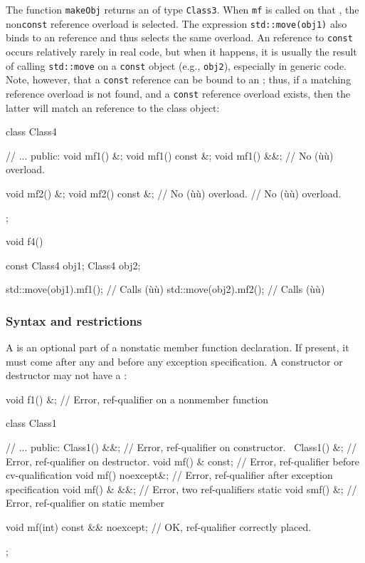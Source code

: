 The function \lstinline!makeObj! returns an  of type
\lstinline!Class3!. When \lstinline!mf! is called on that , the
non\lstinline!const!  reference overload is selected. The
expression \lstinline!std::move(obj1)! also binds to an 
reference and thus selects the same overload. An  reference
to \lstinline!const! occurs relatively rarely in real code, but when it
happens, it is usually the result of calling \lstinline!std::move! on a
\lstinline!const! object (e.g., \lstinline!obj2!), especially in generic code.
Note, however, that a \lstinline!const!  reference can be
bound to an ; thus, if a matching  reference
overload is not found, and a \lstinline!const!  reference
overload exists, then the latter will match an  reference
to the class object:

\begin{emcppslisting}[emcppsbatch=e1]
class Class4
{
    // ...
public:
    void mf1() &;
    void mf1() const &;
    void mf1() &&;
    // No (ù{}ù) overload.

    void mf2() &;
    void mf2() const &;
    // No (ù{}ù) overload.
    // No (ù{}ù) overload.
};

void f4()
{
    const Class4 obj1;
    Class4       obj2;

    std::move(obj1).mf1();  // Calls (ù{}ù)
    std::move(obj2).mf2();  // Calls (ù{}ù)
}
\end{emcppslisting}
    

\subsubsection[Syntax and restrictions]{Syntax and restrictions}\label{syntax-and-restrictions}

A  is an optional part of a nonstatic member
function declaration. If present, it must come after any
 and before any exception specification. A
constructor or destructor may not have a :

\begin{emcppslisting}[emcppsbatch=e2]
void f1() &;  // Error, ref-qualifier on a nonmember function

class Class1
{
    // ...
public:
    Class1() &&;          // Error, ref-qualifier on constructor.
    ~Class1() &;          // Error, ref-qualifier on destructor.
    void mf() & const;    // Error, ref-qualifier before cv-qualification
    void mf() noexcept&;  // Error, ref-qualifier after exception specification
    void mf() & &&;       // Error, two ref-qualifiers
    static void smf() &;  // Error, ref-qualifier on static member

    void mf(int) const && noexcept;  // OK, ref-qualifier correctly placed.
};
\end{emcppslisting}
    

